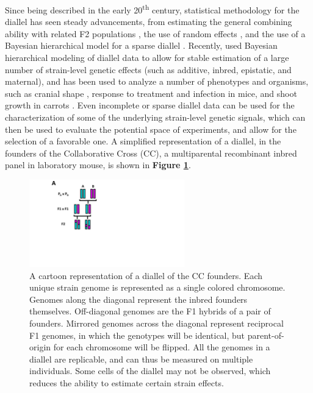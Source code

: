 Since being described in the early 20\textsuperscript{th} century, statistical methodology for the diallel has seen steady advancements, from estimating the general combining ability with related F2 populations \citep{Griffing1956}, the use of random effects \citep{Zhu1996,Tsaih2005}, and the use of a Bayesian hierarchical model for a sparse diallel \citep{Greenberg2010}. Recently, \cite{Lenarcic2012} used Bayesian hierarchical modeling of diallel data to allow for stable estimation of a large number of strain-level genetic effects (such as additive, inbred, epistatic, and maternal), and has been used to analyze a number of phenotypes and organisms, such as cranial shape \citep{Gonzalez2016}, response to treatment and infection \citep{Crowley2014,Maurizio2017} in mice, and shoot growth in carrots \citep{Turner2017}. Even incomplete or sparse diallel data can be used for the characterization of some of the underlying strain-level genetic signals, which can then be used to evaluate the potential space of experiments, and allow for the selection of a favorable one. A simplified representation of a diallel, in the founders of the Collaborative Cross (CC), a multiparental recombinant inbred panel in laboratory mouse, is shown in \textbf{Figure \ref{fig:cartoon_diallel}}.

\begin{figure}
\centering
\includegraphics[width=0.6\textwidth, page=4, trim={1in 0in 3in 0in}, clip]{figures/2-didact/mapping_crosses.pdf}
\caption[Diagram of the diallel]{A cartoon representation of a diallel of the CC founders. Each unique strain genome is represented as a single colored chromosome. Genomes along the diagonal represent the inbred founders themselves. Off-diagonal genomes are the F1 hybrids of a pair of founders. Mirrored genomes across the diagonal represent reciprocal F1 genomes, in which the genotypes will be identical, but parent-of-origin for each chromosome will be flipped. All the genomes in a diallel are replicable, and can thus be measured on multiple individuals. Some cells of the diallel may not be observed, which reduces the ability to estimate certain strain effects. \label{fig:cartoon_diallel}}
\end{figure}

